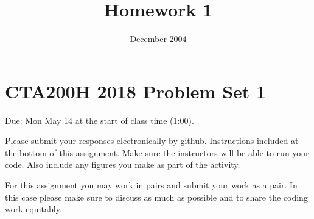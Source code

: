 \documentclass[]{article}
\begin{document}
\title{Homework 1}
\author{}
\date{December 2004}



\section*{CTA200H 2018 Problem Set 1}

Due: Mon May 14 at the start of class time (1:00).

Please submit your responses electronically by github. Instructions included at the bottom of this assignment.  Make sure the instructors will be able to run your code.  Also include any figures you make as part of the activity.

For this assignment you may work in pairs and submit your work as a pair.  In this case please make sure to discuss as much as possible and to share the coding work equitably.
\end{document}
